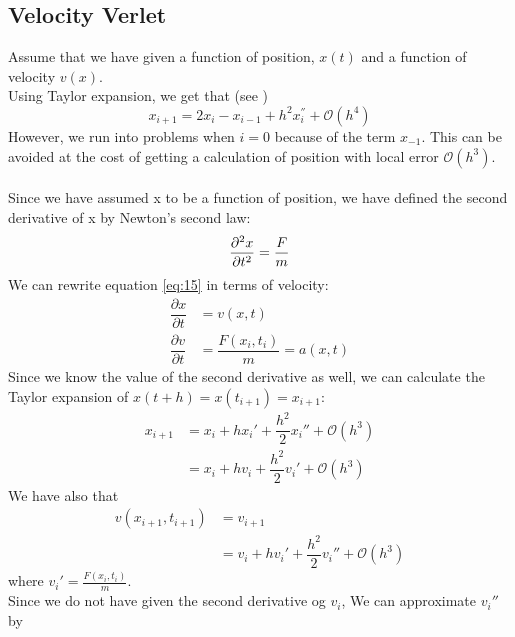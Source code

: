 \documentclass[12pt]{article}
\begin{document}
	\subsection{Velocity Verlet}
	Assume that we have given a function of position, $x(t)$ and a function of velocity $v(x)$.  \\
	Using Taylor expansion, we get that (see \cite{odeNotes}) 
	\begin{equation}
		x_{i+1} = 2x_i - x_{i-1} + h^2x_i^{''} + \mathcal{O}(h^4)
	\end{equation} However, we run into problems when $i = 0$ because of the term $x_{-1}$. This can be avoided at the cost of getting a calculation of position with local error $\mathcal{O}(h^3)$. \\ \\
	Since we have assumed x to be a function of position, we have defined the second derivative of x by Newton's second law:
	\begin{equation}\label{eq:15}
	\dfrac{\partial ^2x}{\partial t^2} = \dfrac{F}{m} \\ 
	\end{equation} 
	We can rewrite equation \ref{eq:15} in terms of velocity:
	\begin{equation*}
	\begin{aligned}
	\dfrac{\partial x}{\partial t} &= v(x,t) \\
	\dfrac{\partial v}{\partial t} &= \dfrac{F(x_i,t_i)}{m} = a(x,t)
	\end{aligned}
	\end{equation*}
	Since we know the value of the second derivative as well, we can calculate the Taylor expansion of $x(t + h) = x(t_{i+1}) = x_{i+1}$:
	\begin{equation}\label{eq:16}
	\begin{aligned}
	x_{i+1} &= x_i + hx_i' + \dfrac{h^2}{2}x_i'' + \mathcal{O}(h^3)  \\
	&= x_i + hv_i + \dfrac{h^2}{2}v_i' + \mathcal{O}(h^3)
	\end{aligned}
	\end{equation} 
	We have also that 
	\begin{equation}\label{eq:17}
	\begin{aligned}
		v(x_{i+1},t_{i+1}) &=v_{i+1} \\
		&= v_i + hv_i' + \dfrac{h^2}{2}v_i'' + \mathcal{O}(h^3)
	\end{aligned}
	\end{equation}
	where $v_i' = \frac{F(x_i,t_i)}{m}$.\\Since we do not have given the second derivative og $v_i$, We can approximate $v_i''$ by 
\end{document}
